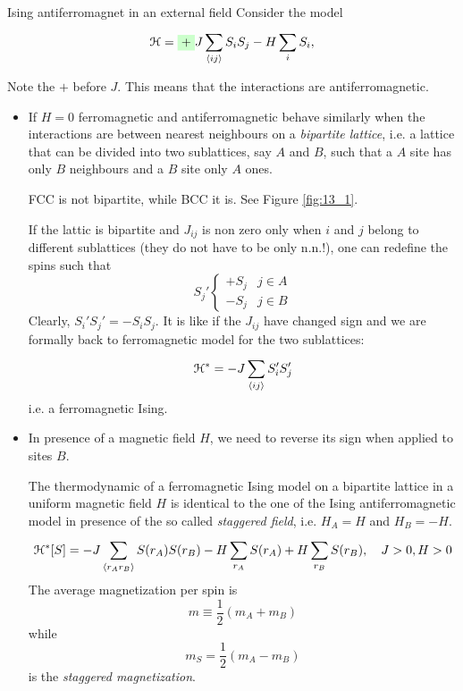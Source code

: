 \documentclass[../main/main.tex]{subfiles}
\begin{document}
\begin{example}{Ising antiferromagnet in an external field}{}
Consider the model
\begin{equation}
  \mathcal{H} = \mathcolorbox{green!20}{+} J \sum_{\expval{ij} }^{} S_i S_j - H \sum_{i}^{} S_i,
\end{equation}
\begin{remark}
Note the \( + \) before \( J \). This means that the interactions are antiferromagnetic.
\end{remark}
\begin{itemize}
\item  If \( H=0 \) ferromagnetic and antiferromagnetic behave similarly when the interactions are between nearest neighbours on a \emph{bipartite lattice}, i.e. a lattice that can be divided into two sublattices, say \( A \) and \( B \), such that a \( A \) site has only \( B \) neighbours and a \( B \) site only \( A \) ones.
\begin{remark}
FCC is not bipartite, while BCC it is. See Figure \ref{fig:13_1}.
\end{remark}

If the lattic is bipartite and \( J_{ij} \) is non zero only when \( i \) and \( j \) belong to different sublattices (they do not have to be only n.n.!), one can redefine the spins such that
\begin{equation}
  S_j' \begin{cases}
    + S_j & j \in A \\
    - S_j & j \in B
\end{cases}
\end{equation}
Clearly, \( S_i'S_j' = - S_i S_j \). It is like if the \( J_{ij} \) have changed sign and we are formally back to ferromagnetic model for the two sublattices:
\begin{equation}
  \mathcal{H}^{*} = - J \sum_{\expval{ij} }^{} S_i' S_j'
\end{equation}
i.e. a ferromagnetic Ising.

\item In presence of a magnetic field \( H \), we need to reverse its sign when applied to sites \( B \).

The thermodynamic of a ferromagnetic Ising model on a bipartite lattice in a uniform magnetic field \( H \) is identical to the one of the Ising antiferromagnetic model in presence of the so called \emph{staggered field}, i.e. \( H_A = H \) and \( H_B = -H \).
\begin{equation}
  \mathcal{H}^* [S] = -J \sum_{\expval{r_A r_B} }^{} S(r_A) S(r_B) - H \sum_{r_A}^{} S(r_A) + H \sum_{r_B}^{} S(r_B), \quad J>0, H>0
\end{equation}
The average magnetization per spin is
\begin{equation}
  m \equiv \frac{1}{2}(m_A+m_B)
\end{equation}
  while
  \begin{equation}
    m_S = \frac{1}{2}(m_A-m_B)
  \end{equation}
  is the \emph{staggered magnetization}.


\end{itemize}
\end{example}
\end{document}

